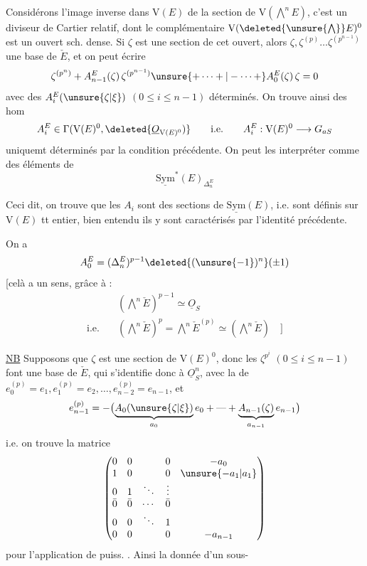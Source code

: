 Considérons l'image inverse dans $\mathrm V(E)$ de la section  de
$\mathrm V(\bigwedge^{n}E)$, 
c'est un diviseur de Cartier relatif, dont le complémentaire
$\mathrm V(\deleted{\unsure{\bigwedge}}E)^0$ est un ouvert  sch. dense.
Si $\zeta$ est une section de cet ouvert, alors $\zeta,\zeta^{(p)}\ldots\zeta^{(p^{n-1})}$
 une base de $\check E$, et on peut écrire
\[
 \zeta^{(p^n)}+A^E_{n-1}(\zeta)\,\zeta^{(p^{n-1})}
 \unsure{+\cdots+|-\cdots+}A^E_0(\zeta)\,\zeta=0
\]
avec des $A_i^E(\unsure{\zeta|\xi})$ $(0\leq i\leq n-1)$  déterminés.
On trouve ainsi des hom
\[
 A_i^E\in\Gamma(\mathrm V(E)^0,\deleted{\underline O_{\mathrm V(E)^0})}
 \qquad\text{i.e.}\qquad A_i^E:\mathrm V(E)^0\longrightarrow G_{aS}
\]
uniquemt déterminés par la condition précédente.
On peut les interpréter comme des éléments de
\[
 \underline{\mathrm{Sym}}^*(E)_{\Delta_n^E}
\]

Ceci dit, on trouve que les $A_i$ sont des sections de $\underline{\mathrm{Sym}}(E)$, i.e. sont définis sur
$\mathrm V(E)$ tt entier, bien entendu ils y sont caractérisés par l'identité précédente.

On a 
\[
 A_0^E=(\Delta_n^E)^{p-1}\deleted{(\unsure{-1})^n}(\pm1)
\]
[celà a un sens, grâce à :
\[
 \begin{aligned}
 &(\textstyle\bigwedge^n\check E)^{p-1}\simeq\underline O_S\\
 \text{i.e.}\quad&(\textstyle\bigwedge^n\check E)^p=\textstyle\bigwedge^n\check E^{(p)}\simeq
 (\textstyle\bigwedge^n\check E)\quad\big]
 \end{aligned}
\]

\uline{NB} Supposons que $\zeta$ est une section de $\mathrm V(E)^0$, 
donc les $\zeta^{p^i}$ $(0\leq i\leq n-1)$ font une base de $\check E$, qui s'identifie donc à
$\underline O_S^{n}$, avec la  de  
$e_0^{(p)}=e_1,e_1^{(p)}=e_2,\ldots,e_{n-2}^{(p)}=e_{n-1}$, et
\[
 e_{n-1}^{(p)}=-\bigl(\underbrace{A_0(\unsure{\zeta|\xi})}_{a_0}e_0+
 \text{---}+\underbrace{A_{n-1}(\zeta)}_{a_{n-1}}e_{n-1}\bigr)
\]
i.e. on trouve la matrice
\[
 \begin{pmatrix}
 0&0&&0&-a_0\\
 1&0&&0&\unsure{-a_1|a_1}\\
 0&1&\ddots&\vdots&\\
 \bar 0&\bar 0&\cdots&\bar 0&\\
 0&0&\ddots&1&\\
 0&0&&0&-a_{n-1}
 \end{pmatrix}
\]
pour l'application de puiss. . Ainsi 
  la donnée
 d'un sous- \textemdash\textemdash

